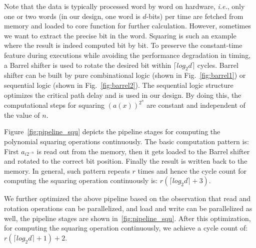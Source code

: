 \documentclass[runningheads]{llncs}
\begin{document}
Note that the data is typically processed word by word on hardware, \textit{i.e.}, only one or two words (in our design, one word is $d$-bits) per time are fetched from memory and loaded to core function for further calculation. However, sometimes we want to extract the precise bit in the word.
Squaring is such an example where the result is indeed computed bit by bit. 
To preserve the constant-time feature during executions while
avoiding the performance degradation in timing,
a Barrel shifter
is used to rotate the desired bit within $\lceil log_2d\rceil$ cycles. Barrel shifter can be built by pure combinational logic (shown in Fig.~\ref{fig:barrel1}) or sequential logic (shown in Fig.~\ref{fig:barrel2}). The sequential logic structure optimizes the critical path delay and is used in our design. By doing this, the computational steps for squaring $(a(x))^{2^n}$ are constant and independent of the value of $n$.

Figure~\ref{fig:pipeline_squ} depicts the pipeline stages for computing the
polynomial squaring operations continuously.
The basic computation pattern is:
First $a_{i2^{-n}}$ is read out from the memory,
then it gets loaded to the Barrel shifter and rotated to the correct bit position.
Finally the result is written back to the memory.
In general, such pattern repeats $r$ times and
hence the cycle count for computing the squaring operation continuously is:
$
r(\lceil log_2d\rceil+3)
$.

We further optimized the above pipeline based on the observation
that read and rotation operations can be parallelized,
and load and write can be parallelized as well,
the pipeline stages are shown in~\ref{fig:pipeline_squ}.
After this optimization, for computing the squaring operation continuously, we achieve a cycle count of:
$r(\lceil log_2d\rceil+1)+2$.
\end{document}
